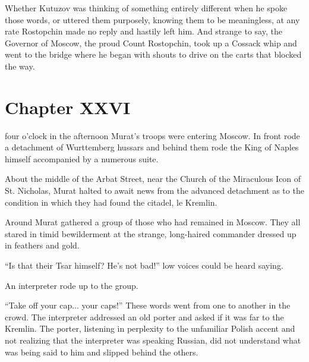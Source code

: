 Whether Kutuzov was thinking of something entirely different when
he spoke those words, or uttered them purposely, knowing them to
be meaningless, at any rate Rostopchin made no reply and hastily
left him.  And strange to say, the Governor of Moscow, the proud
Count Rostopchin, took up a Cossack whip and went to the bridge
where he began with shouts to drive on the carts that blocked the
way.


\chapter*{Chapter XXVI} \ifaudio {}
\fi

 four o'clock in the afternoon Murat's troops were entering
Moscow. In front rode a detachment of Wurttemberg hussars and
behind them rode the King of Naples himself accompanied by a
numerous suite.

About the middle of the Arbat Street, near the Church of the
Miraculous Icon of St. Nicholas, Murat halted to await news from
the advanced detachment as to the condition in which they had
found the citadel, le Kremlin.

Around Murat gathered a group of those who had remained in
Moscow. They all stared in timid bewilderment at the strange,
long-haired commander dressed up in feathers and gold.

``Is that their Tsar himself? He's not bad!'' low voices could be
heard saying.

An interpreter rode up to the group.

``Take off your cap... your caps!'' These words went from one to
another in the crowd. The interpreter addressed an old porter and
asked if it was far to the Kremlin. The porter, listening in
perplexity to the unfamiliar Polish accent and not realizing that
the interpreter was speaking Russian, did not understand what was
being said to him and slipped behind the others.


